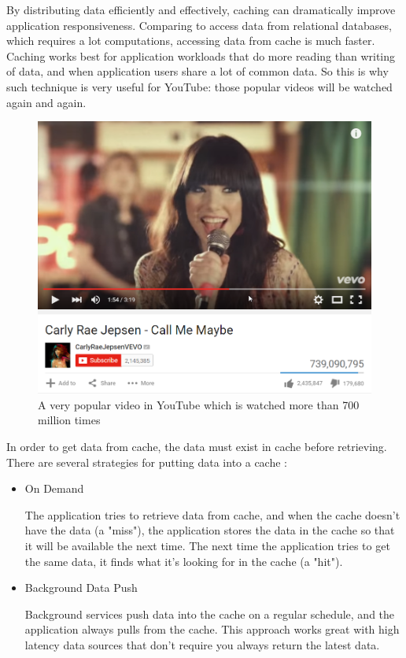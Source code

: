 By distributing data efficiently and effectively, caching can dramatically improve application responsiveness. Comparing to access data from relational databases, which requires a lot computations, accessing data from cache is much faster. Caching works best for application workloads that do more reading than writing of data, and when application users share a lot of common data. So this is why such technique is very useful for YouTube: those popular videos will be watched again and again.

\begin{figure}[H]
	\centering
	\includegraphics[width=0.7\linewidth]{CallMeMaybe.png}
	\caption{A very popular video in YouTube which is watched more than 700 million times}
\end{figure}

In order to get data from cache, the data must exist in cache before retrieving. There are several strategies for putting data into a cache \cite{azure:distributed}:
\begin{itemize}
	\item On Demand

	The application tries to retrieve data from cache, and when the cache doesn't have the data (a "miss"), the application stores the data in the cache so that it will be available the next time. The next time the application tries to get the same data, it finds what it's looking for in the cache (a "hit").

	\item Background Data Push

	Background services push data into the cache on a regular schedule, and the application always pulls from the cache. This approach works great with high latency data sources that don't require you always return the latest data.
\end{itemize}

